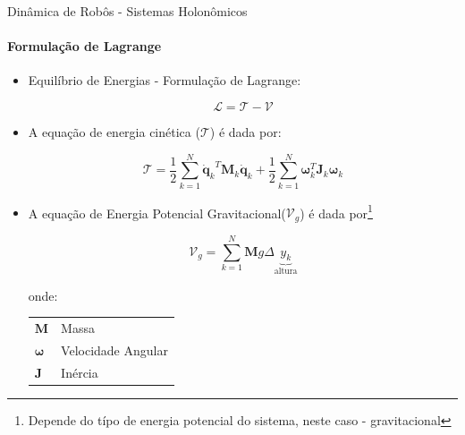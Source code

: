\documentclass[aspectratio=169]{beamer}
\begin{document}
\begin{frame}{Dinâmica de Robôs - Sistemas Holonômicos}
    \framesubtitle{Formulação de Lagrange}

    \begin{itemize}

        \item Equilíbrio de Energias - Formulação de Lagrange:

              \begin{equation}
                  \mathcal{L}= \mathcal{T} - \mathcal{V}
              \end{equation}

        \item A equação de energia cinética ($\mathcal{T}$) é dada por:

            \begin{equation}
                \mathcal{T} = \frac{1}{2} \sum\limits_{k=1}^{N}{\mathbf{\dot{q}}_k}^T  \mathbf{M}_k {\mathbf{\dot{q}}_k}+ \frac{1}{2} \sum\limits_{k=1}^{N}\mathbf{\omega}_k^T \mathbf{J}_k \mathbf{\omega}_k
            \end{equation}

        \item A equação de Energia Potencial Gravitacional($\mathcal{V}_g$) é dada por\footnote{Depende do típo de energia potencial do sistema, neste caso - gravitacional}

            \begin{equation}
                \mathcal{V}_g = \sum\limits_{k=1}^{N}\mathbf{M}g\Delta \underbrace{y_k}_{\text{altura}}
            \end{equation}  


              \begin{block}{}
                  \scriptsize{
                      onde:
                      \begin{tabular}{l|l}
                          $\mathbf{M}$               & Massa              \\
                          $\mathbf{\omega}$ & Velocidade Angular \\
                          $\mathbf{J}$               & Inércia         \\
                      \end{tabular}}
              \end{block}
    \end{itemize}
\end{frame}
\end{document}
